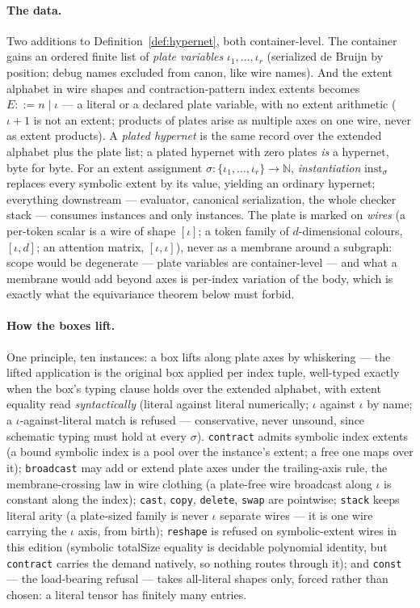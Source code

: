 \paragraph{The data.} Two additions to
Definition~\ref{def:hypernet}, both container-level. The container
gains an ordered finite list of \emph{plate variables}
$\iota_1, \dots, \iota_r$ (serialized de Bruijn by position; debug
names excluded from canon, like wire names). And the extent alphabet
in wire shapes and contraction-pattern index extents becomes
$E ::= n \mid \iota$ --- a literal or a declared plate variable, with
no extent arithmetic ($\iota + 1$ is not an extent; products of
plates arise as multiple axes on one wire, never as extent
products). A \emph{plated hypernet} is the same record over the
extended alphabet plus the plate list; a plated hypernet with zero
plates \emph{is} a hypernet, byte for byte. For an extent assignment
$\sigma : \{\iota_1, \dots, \iota_r\} \to \mathbb{N}$,
\emph{instantiation} $\mathrm{inst}_\sigma$ replaces every symbolic
extent by its value, yielding an ordinary hypernet; everything
downstream --- evaluator, canonical serialization, the whole checker
stack --- consumes instances and only instances. The plate is marked
on \emph{wires} (a per-token scalar is a wire of shape $[\iota]$; a
token family of $d$-dimensional colours, $[\iota, d]$; an attention
matrix, $[\iota, \iota]$), never as a membrane around a subgraph:
scope would be degenerate --- plate variables are container-level ---
and what a membrane would add beyond axes is per-index variation of
the body, which is exactly what the equivariance theorem below must
forbid.

\paragraph{How the boxes lift.} One principle, ten instances: a box
lifts along plate axes by whiskering --- the lifted application is
the original box applied per index tuple, well-typed exactly when
the box's typing clause holds over the extended alphabet, with
extent equality read \emph{syntactically} (literal against literal
numerically; $\iota$ against $\iota$ by name; a $\iota$-against-literal
match is refused --- conservative, never unsound, since schematic
typing must hold at every $\sigma$). \texttt{contract} admits
symbolic index extents (a bound symbolic index is a pool over the
instance's extent; a free one maps over it); \texttt{broadcast} may
add or extend plate axes under the trailing-axis rule, the
membrane-crossing law in wire clothing (a plate-free wire broadcast
along $\iota$ is constant along the index); \texttt{cast},
\texttt{copy}, \texttt{delete}, \texttt{swap} are pointwise;
\texttt{stack} keeps literal arity (a plate-sized family is never
$\iota$ separate wires --- it is one wire carrying the $\iota$ axis,
from birth); \texttt{reshape} is refused on symbolic-extent wires in
this edition (symbolic totalSize equality is decidable polynomial
identity, but \texttt{contract} carries the demand natively, so
nothing routes through it); and \texttt{const} --- the load-bearing
refusal --- takes all-literal shapes only, forced rather than
chosen: a literal tensor has finitely many entries.

